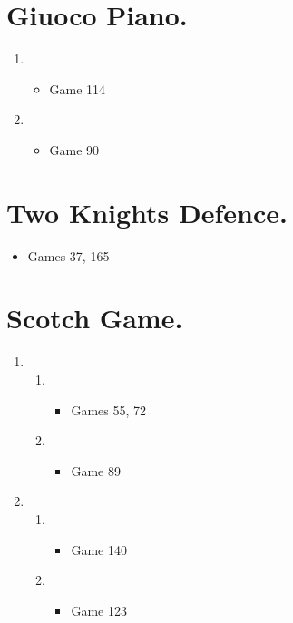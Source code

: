 \section{Giuoco Piano.} 
\newgame{}

\begin{enumerate}
\item {}
\begin{itemize}
\item Game 114
\end{itemize}

\item {}
\begin{itemize}
\item Game 90
\end{itemize}
\end{enumerate}

\section{Two Knights Defence.}
\newgame{}
\begin{itemize}
\item Games 37, 165
\end{itemize}

\section{Scotch Game.}
\newgame{}

\begin{enumerate}
\item {}
\begin{enumerate}
\item {}
\begin{itemize}
\item Games 55, 72
\end{itemize}
\item {}
\begin{itemize}
\item Game 89
\end{itemize}
\end{enumerate}

\item {}
\begin{enumerate}
\item {}
\begin{itemize}
\item Game 140
\end{itemize}
\item {}
\begin{itemize}
\item Game 123
\end{itemize}
\end{enumerate}
\end{enumerate}

